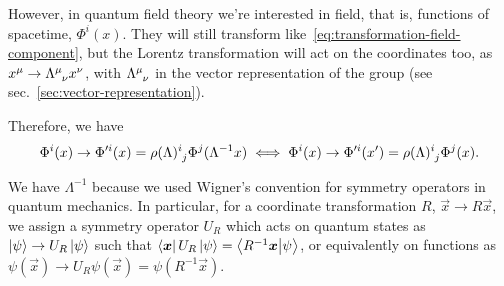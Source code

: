 However, in quantum field theory we're interested in field, that is, functions of spacetime, $\Phi^i(x)$. They will still transform like~\eqref{eq:transformation-field-component}, but the Lorentz transformation will act on the coordinates too, as $x^\mu \to \tensor{\Lambda}{^\mu_\nu}x^\nu$, with $\tensor{\Lambda}{^\mu_\nu}$ in the vector representation of the group (see sec.~\ref{sec:vector-representation}).

Therefore, we have
\begin{equation}\label{eq:lorentz-field-variation}
   \Phi^i(x) \to \Phi'^i (x) = \tensor{\rho(\Lambda)}{^i_j} \Phi^j(\Lambda^{-1}x) \iff \Phi^i(x) \to \Phi'^i(x') = \tensor{\rho(\Lambda)}{^i_j} \Phi^j(x) .
\end{equation}

\begin{remark}
    We have $\Lambda^{-1}$ because we used Wigner's convention for symmetry operators in quantum mechanics. In particular, for a coordinate transformation $R$, $\vec{x} \to R \vec{x}$, we assign a symmetry operator $U_R$ which acts on quantum states as $\ket{\psi} \to U_R \ket{\psi}$ such that $\bra{\boldsymbol{x}}U_R\ket{\psi} = \braket{R^{-1}\boldsymbol{x}}{\psi}$, or equivalently on functions as $\psi(\vec{x})\to U_R \psi(\vec{x})=\psi(R^{-1}\vec{x})$.
\end{remark}

